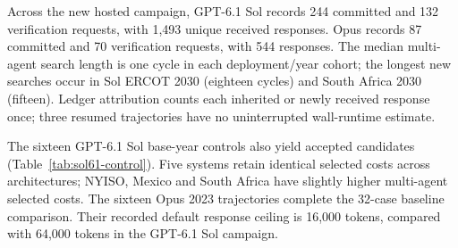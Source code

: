 \documentclass[pdflatex,sn-nature]{sn-jnl}
\begin{document}
\begin{appendices}
Across the new hosted campaign, GPT-6.1 Sol records 244 committed and 132 verification requests, with 1,493 unique received responses. Opus records 87 committed and 70 verification requests, with 544 responses. The median multi-agent search length is one cycle in each deployment/year cohort; the longest new searches occur in Sol ERCOT 2030 (eighteen cycles) and South Africa 2030 (fifteen). Ledger attribution counts each inherited or newly received response once; three resumed trajectories have no uninterrupted wall-runtime estimate.

The sixteen GPT-6.1 Sol base-year controls also yield accepted candidates (Table~\ref{tab:sol61-control}). Five systems retain identical selected costs across architectures; NYISO, Mexico and South Africa have slightly higher multi-agent selected costs. The sixteen Opus 2023 trajectories complete the 32-case baseline comparison. Their recorded default response ceiling is 16,000 tokens, compared with 64,000 tokens in the GPT-6.1 Sol campaign.


\end{appendices}
\end{document}

